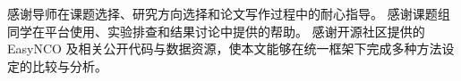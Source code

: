 
感谢导师在课题选择、研究方向选择和论文写作过程中的耐心指导。
感谢课题组同学在平台使用、实验排查和结果讨论中提供的帮助。
感谢开源社区提供的 EasyNCO 及相关公开代码与数据资源，使本文能够在统一框架下完成多种方法设定的比较与分析。

